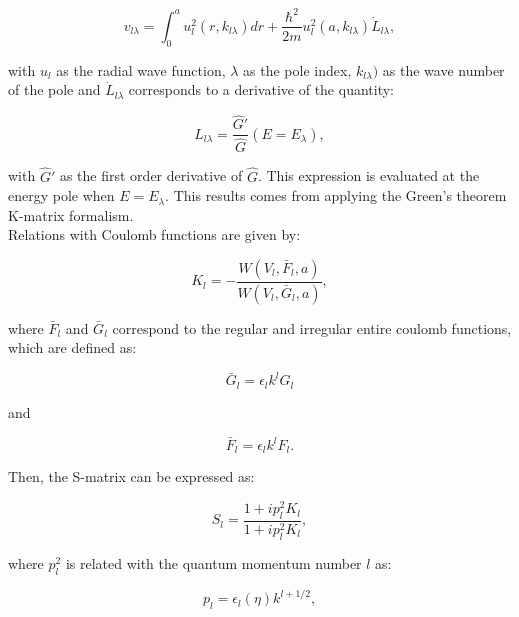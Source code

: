 \documentclass[openany]{book}
\begin{document}
\begin{equation}\label{eq:rmatrix_kmatrix_v}
	v_{l\lambda} = \int_0^{a} u^2_l(r, k_{l\lambda}) dr  + \frac{\hbar^2}{2m} u^2_l(a,  k_{l\lambda}) \dot {L}_{l\lambda},
\end{equation}

with $u_l$ as the radial wave function, $\lambda$ as the pole index, $k_{l\lambda})$ as the wave number of the pole and $\dot {L}_{l\lambda}$ corresponds to a derivative of the quantity:

\begin{equation}\label{eq:rmatrix_kmatrix_L}
	L_{l\lambda} = \frac{\hat G'}{\hat G}(E = E_\lambda), 
\end{equation}

with $\hat G'$ as the first order derivative of $\hat G$. This expression is evaluated at the energy pole when $E = E_\lambda$. This results comes from applying the Green's theorem K-matrix formalism. \\

Relations with Coulomb functions are given by:

\begin{equation}\label{eq:rmatrix_kmatrix_coulomb}
	K_l = - \frac{W(V_l, \bar F_l, a)}{W(V_l, \bar G_l, a)},
\end{equation}

where $\bar F_l$ and $\bar G_l$ correspond to the regular and irregular entire coulomb functions, which are defined as:

\begin{equation}\label{eq:rmatrix_kmatrix_coulombG_entire}
	\bar G_l = \epsilon_l k^l G_l
\end{equation}

and 

\begin{equation}\label{eq:rmatrix_kmatrix_coulombF_entire}
	\bar F_l = \epsilon_l k^l F_l.
\end{equation}

 Then, the S-matrix can be expressed as: 

\begin{equation}\label{eq:rmatrix_kmatrix_Smatrix}
	S_l = \frac{1 + ip^2_l K_l}{1 + ip^2_l K_l},
\end{equation}

where $p^2_l$ is related with the quantum momentum number $l$ as:

\begin{equation}\label{eq:rmatrix_kmatrix_pl}
	p_l = \epsilon_l(\eta) k^{l + 1/2},
\end{equation}
\end{document}
